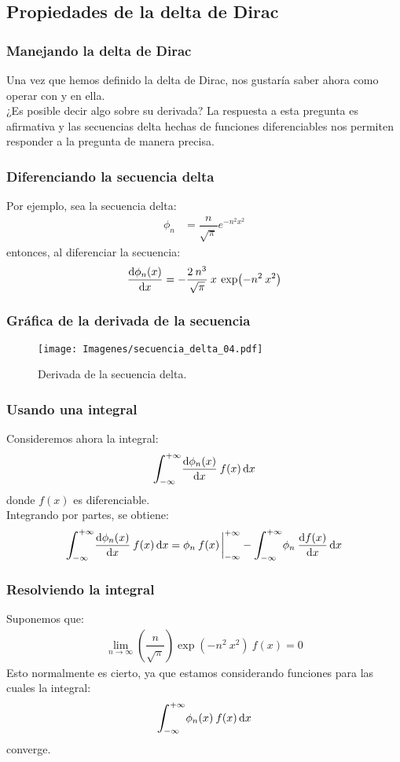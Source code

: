 \documentclass[12pt]{beamer}
\begin{document}
\subsection{Propiedades de la delta de Dirac}

\begin{frame}
\frametitle{Manejando la delta de Dirac}
Una vez que hemos definido la delta de Dirac, nos gustaría saber ahora como operar con y en ella. 
\\
\bigskip
\pause
¿Es posible decir algo sobre su derivada? \pause La respuesta a esta pregunta es afirmativa y las secuencias delta hechas de funciones diferenciables nos permiten responder a la pregunta de manera precisa.
\end{frame}
\begin{frame}
\frametitle{Diferenciando la secuencia delta}
Por ejemplo, sea la secuencia delta:
\pause
\begin{align*}
\phi_{n} &= \dfrac{n}{\sqrt{\pi}} e^{-n^{2} x^{2}}
\end{align*}
\pause
entonces, al diferenciar la secuencia:
\pause
\begin{align*}
\dv{\phi_{n}(x)}{x} = - \dfrac{2 \: n^{3}}{\sqrt{\pi}} \: x \: \exp(-n^{2} \: x^{2})
\end{align*}
\end{frame}
\begin{frame}
\frametitle{Gráfica de la derivada de la secuencia}
\begin{figure}[H]
    \centering
    \texttt{[image: Imagenes/secuencia\_delta\_04.pdf]}
    \caption{Derivada de la secuencia delta.}
    \label{fig:fig_figura_delta_04}
\end{figure}
\end{frame}
\begin{frame}
\frametitle{Usando una integral}
Consideremos ahora la integral:
\begin{align*}
\scaleint{6ex}_{\bs -\infty}^{+\infty} \dv{\phi_{n}(x)}{x} \: f (x) \dd{x}
\end{align*}
donde $f (x)$ es diferenciable.
\\
\bigskip
\pause
Integrando por partes, se obtiene:
\pause
\begin{align*}
\scaleint{6ex}_{\bs -\infty}^{+\infty} \dv{\phi_{n}(x)}{x} \: f (x) \dd{x} = \phi_{n} \: f (x) \eval_{-\infty}^{+\infty} - \scaleint{6ex}_{\bs -\infty}^{+\infty} \phi_{n} \: \dv{f (x)}{x} \dd{x}
\end{align*}
\end{frame}
\begin{frame}
\frametitle{Resolviendo la integral}
Suponemos que:
\pause
\begin{align*}
\lim_{n \to \infty} \left( \dfrac{n}{\sqrt{\pi}} \right) \exp(-n^{2} \: x^{2}) \: f (x) = 0
\end{align*}
\pause
Esto normalmente es cierto, ya que estamos considerando funciones para las cuales la integral:
\pause
\begin{align*}
\scaleint{6ex}_{\bs -\infty}^{+\infty} \phi_{n}(x) \: f (x) \dd{x} 
\end{align*}
converge.
\end{frame}
\end{document}
